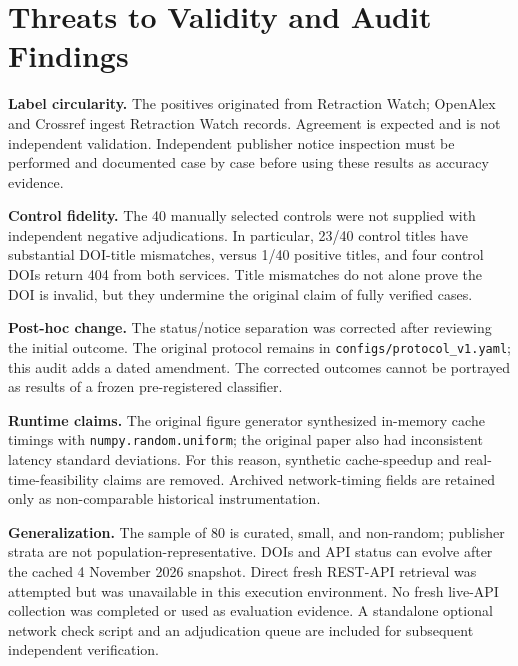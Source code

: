 \documentclass[10pt,a4paper,twocolumn]{article}
\begin{document}
\section{Threats to Validity and Audit Findings}
\textbf{Label circularity.} The positives originated from Retraction Watch; OpenAlex and Crossref ingest Retraction Watch records. Agreement is expected and is not independent validation. Independent publisher notice inspection must be performed and documented case by case before using these results as accuracy evidence.

\textbf{Control fidelity.} The 40 manually selected controls were not supplied with independent negative adjudications. In particular, 23/40 control titles have substantial DOI-title mismatches, versus 1/40 positive titles, and four control DOIs return 404 from both services. Title mismatches do not alone prove the DOI is invalid, but they undermine the original claim of fully verified cases.

\textbf{Post-hoc change.} The status/notice separation was corrected after reviewing the initial outcome. The original protocol remains in \texttt{configs/protocol\_v1.yaml}; this audit adds a dated amendment. The corrected outcomes cannot be portrayed as results of a frozen pre-registered classifier.

\textbf{Runtime claims.} The original figure generator synthesized in-memory cache timings with \texttt{numpy.random.uniform}; the original paper also had inconsistent latency standard deviations. For this reason, synthetic cache-speedup and real-time-feasibility claims are removed. Archived network-timing fields are retained only as non-comparable historical instrumentation.

\textbf{Generalization.} The sample of 80 is curated, small, and non-random; publisher strata are not population-representative. DOIs and API status can evolve after the cached 4 November 2026 snapshot. Direct fresh REST-API retrieval was attempted but was unavailable in this execution environment. No fresh live-API collection was completed or used as evaluation evidence. A standalone optional network check script and an adjudication queue are included for subsequent independent verification.
\end{document}
